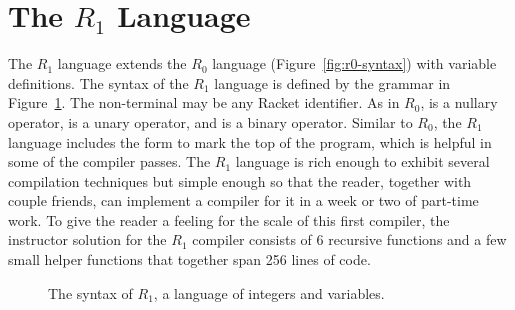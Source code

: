 \documentclass[11pt]{book}
\begin{document}
\section{The $R_1$ Language}
\label{sec:s0}

The $R_1$ language extends the $R_0$ language
(Figure~\ref{fig:r0-syntax}) with variable definitions.  The syntax of
the $R_1$ language is defined by the grammar in
Figure~\ref{fig:r1-syntax}.  The non-terminal \Var{} may be any Racket
identifier. As in $R_0$,  is a nullary operator, \key{-} is
a unary operator, and \key{+} is a binary operator.  Similar to $R_0$,
the $R_1$ language includes the  form to mark the top of
the program, which is helpful in some of the compiler passes.  The
$R_1$ language is rich enough to exhibit several compilation
techniques but simple enough so that the reader, together with couple
friends, can implement a compiler for it in a week or two of part-time
work.  To give the reader a feeling for the scale of this first
compiler, the instructor solution for the $R_1$ compiler consists of 6
recursive functions and a few small helper functions that together
span 256 lines of code.

\begin{figure}[btp]
\centering
{}
\caption{The syntax of $R_1$, a language of integers and variables.}
\label{fig:r1-syntax}
\end{figure}
\end{document}
